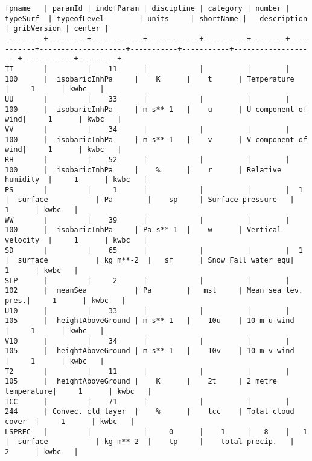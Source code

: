 \documentclass{egu}                  %
\begin{document}
\begin{landscape} 
\begin{scriptsize}\begin{verbatim}
fpname   | paramId | indofParam | discipline | category | number | typeSurf  | typeofLevel        | units     | shortName |   description      | gribVersion | center |
---------+---------+------------+------------+----------+--------+-----------+--------------------+-----------+-----------+--------------------+------------+---------+
TT       |         |    11      |            |          |        |  100      |  isobaricInhPa     |    K      |    t      | Temperature        |     1      | kwbc   |
UU       |         |    33      |            |          |        |  100      |  isobaricInhPa     | m s**-1   |    u      | U component of wind|     1      | kwbc   |
VV       |         |    34      |            |          |        |  100      |  isobaricInhPa     | m s**-1   |    v      | V component of wind|     1      | kwbc   |
RH       |         |    52      |            |          |        |  100      |  isobaricInhPa     |    %      |    r      | Relative humidity  |     1      | kwbc   |
PS       |         |     1      |            |          |        |  1        |  surface           | Pa        |    sp     | Surface pressure   |     1      | kwbc   |
WW       |         |    39      |            |          |        |  100      |  isobaricInhPa     | Pa s**-1  |    w      | Vertical velocity  |     1      | kwbc   |
SD       |         |    65      |            |          |        |  1        |  surface           | kg m**-2  |   sf      | Snow Fall water equ|     1      | kwbc   |
SLP      |         |     2      |            |          |        |  102      |  meanSea           | Pa        |   msl     | Mean sea lev. pres.|     1      | kwbc   |
U10      |         |    33      |            |          |        |  105      |  heightAboveGround | m s**-1   |    10u    | 10 m u wind        |     1      | kwbc   |
V10      |         |    34      |            |          |        |  105      |  heightAboveGround | m s**-1   |    10v    | 10 m v wind        |     1      | kwbc   |
T2       |         |    11      |            |          |        |  105      |  heightAboveGround |    K      |    2t     | 2 metre temperature|     1      | kwbc   | 
TCC      |         |    71      |            |          |        |  244      | Convec. cld layer  |    %      |    tcc    | Total cloud cover  |     1      | kwbc   |
LSPREC   |         |            |     0      |    1     |   8    |   1       |  surface           | kg m**-2  |    tp     |    total precip.   |     2      | kwbc   |

\end{verbatim}
\end{scriptsize}
\end{landscape}
\end{document}
